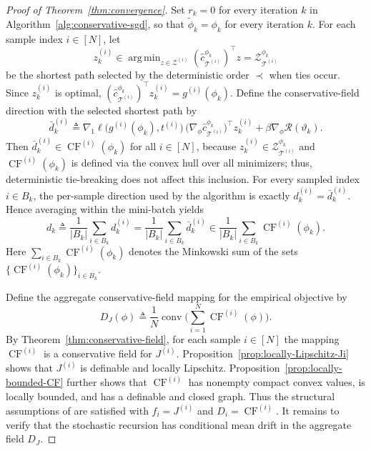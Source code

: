 \documentclass[11pt, letterpaper, oneside, reqno]{amsart}
\DeclareMathOperator*{\argmin}{arg\,min}
\newcommand{\Let}{\triangleq}
\begin{document}
\begin{proof}[Proof of Theorem~\ref{thm:convergence}]
Set $r_k=0$ for every iteration $k$ in Algorithm~\ref{alg:conservative-sgd}, so that $\tilde\phi_k=\phi_k$ for every iteration $k$.
For each sample index $i\in[N]$, let 
\[
z_k^{(i)}\in\argmin_{z\in\mathcal Z^{(i)}} (\hat c_{\mathcal T^{(i)}}^{\phi_k})^\top z
= \mathcal Z_{\mathcal T^{(i)}}^{\phi_k}
\]
be the shortest path selected by the deterministic order $\prec$ when ties occur.
Since $z_k^{(i)}$ is optimal, $(\hat c_{\mathcal T^{(i)}}^{\phi_k})^\top z_k^{(i)}=g^{(i)}(\phi_k)$. Define the conservative-field direction with the selected shortest path by
\[
\bar d_k^{(i)} 
\Let \nabla_1\ell\bigl(g^{(i)}(\phi_k),t^{(i)}\bigr)\,\bigl(\nabla_\phi \hat c_{\mathcal T^{(i)}}^{\phi_k}\bigr)^\top z_k^{(i)} + \beta \nabla_\phi \mathcal R(\vartheta_k).
\]
Then $\bar d_k^{(i)}\in \operatorname{CF}^{(i)}(\phi_k)$ for all $i\in[N]$,
because $z_k^{(i)}\in\mathcal Z_{\mathcal T^{(i)}}^{\phi_k}$ and $\operatorname{CF}^{(i)}(\phi_k)$ is defined via the convex hull over all minimizers; thus, deterministic tie-breaking does not affect this inclusion.
For every sampled index $i\in B_k$, the per-sample direction used by the algorithm is exactly $d_k^{(i)}=\bar d_k^{(i)}$.
Hence averaging within the mini-batch yields
\[
d_k\Let \frac{1}{|B_k|}\sum_{i\in B_k} d_k^{(i)}
= \frac{1}{|B_k|}\sum_{i\in B_k} \bar d_k^{(i)}
\in \frac{1}{|B_k|}\sum_{i\in B_k}\operatorname{CF}^{(i)}(\phi_k).
\]
Here $\sum_{i\in B_k}\operatorname{CF}^{(i)}(\phi_k)$ denotes the Minkowski sum of the sets $\{\operatorname{CF}^{(i)}(\phi_k)\}_{i\in B_k}$.

Define the aggregate conservative-field mapping for the empirical objective by
\[
D_J(\phi)\Let \frac{1}{N}\operatorname{conv}\bigl(\sum_{i=1}^N \operatorname{CF}^{(i)}(\phi)\bigr).
\]
By Theorem~\ref{thm:conservative-field}, for each sample $i\in[N]$ the mapping $\operatorname{CF}^{(i)}$ is a conservative field for $J^{(i)}$. Proposition~\ref{prop:locally-Lipschitz-Ji} shows that $J^{(i)}$ is definable and locally Lipschitz. Proposition~\ref{prop:locally-bounded-CF} further shows that $\operatorname{CF}^{(i)}$ has nonempty compact convex values, is locally bounded, and has a definable and closed graph. Thus the structural assumptions of \cite[Theorem~9]{ref:bolte2021conservative} are satisfied with $f_i=J^{(i)}$ and $D_i=\operatorname{CF}^{(i)}$. It remains to verify that the stochastic recursion has conditional mean drift in the aggregate field $D_J$.


\end{proof}
\end{document}
